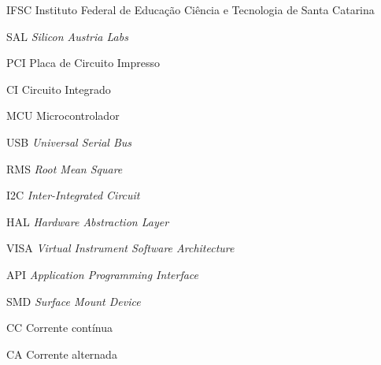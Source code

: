 \documentclass{ifscTCC} %
\begin{document}
\begin{siglas}
   \item[IFSC] Instituto Federal de Educação Ciência e Tecnologia de Santa Catarina
   \item[SAL] \textit{Silicon Austria Labs} 
   \item[PCI] Placa de Circuito Impresso
   \item[CI] Circuito Integrado
   \item[MCU] Microcontrolador
   \item[USB] \textit{Universal Serial Bus}
   \item[RMS] \textit{Root Mean Square}
   \item[I2C] \textit{Inter-Integrated Circuit}
   \item[HAL] \textit{Hardware Abstraction Layer}
   \item[VISA] \textit{Virtual Instrument Software Architecture}
   \item[API] \textit{Application Programming Interface}
   \item[SMD] \textit{Surface Mount Device}
   \item[CC] Corrente contínua
   \item[CA] Corrente alternada
\end{siglas}
\end{document}
